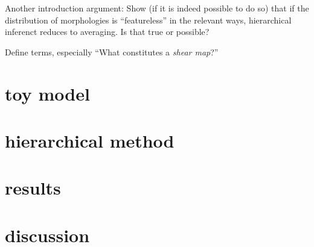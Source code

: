 \documentclass[12pt]{article}
\begin{document}
Another introduction argument: Show (if it is indeed possible to do
so) that if the distribution of morphologies is ``featureless'' in the
relevant ways, hierarchical inferenct reduces to averaging.  Is that
true or possible?

Define terms, especially ``What constitutes a \emph{shear map}?''

\section{toy model}

\section{hierarchical method}

\section{results}

\section{discussion}
\end{document}
